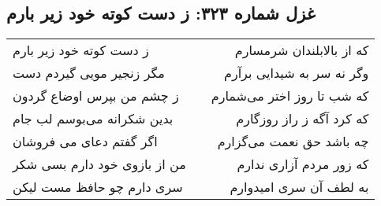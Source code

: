 \begin{center}
\section*{غزل شماره ۳۲۳: ز دست کوته خود زیر بارم}
\label{sec:sh323}
\begin{longtable}{l p{0.5cm} r}
ز دست کوته خود زیر بارم
&&
که از بالابلندان شرمسارم
\\
مگر زنجیر مویی گیردم دست
&&
وگر نه سر به شیدایی برآرم
\\
ز چشم من بپرس اوضاع گردون
&&
که شب تا روز اختر می‌شمارم
\\
بدین شکرانه می‌بوسم لب جام
&&
که کرد آگه ز راز روزگارم
\\
اگر گفتم دعای می فروشان
&&
چه باشد حق نعمت می‌گزارم
\\
من از بازوی خود دارم بسی شکر
&&
که زور مردم آزاری ندارم
\\
سری دارم چو حافظ مست لیکن
&&
به لطف آن سری امیدوارم
\\
\end{longtable}
\end{center}
